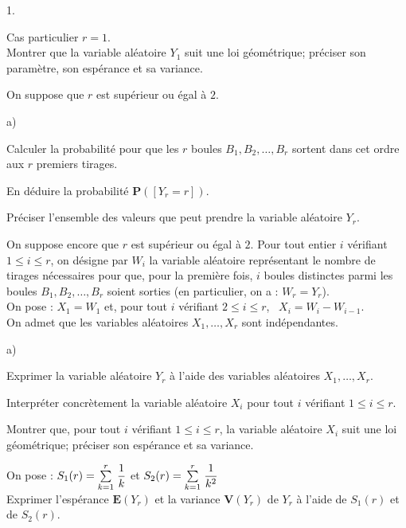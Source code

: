 \documentclass[11pt]{article}%
\begin{document}
\begin{noliste}{1.}
 \setlength{\itemsep}{4mm}
\item Cas particulier $r = 1$. \\
Montrer que la variable aléatoire $Y_{1}$ suit une loi géométrique;
préciser
son paramètre, son espérance et sa variance.

\item On suppose que $r$ est supérieur ou égal à $2$.

\begin{noliste}{a)}
 \setlength{\itemsep}{2mm}
\item Calculer la probabilité pour que les $r$ boules
$B_{1},B_{2},\ldots,B_{r}$ sortent dans cet ordre aux $r$ premiers
tirages.

\item En déduire la probabilité $\mathbf{P}([Y_{r} = r])$.

\item Préciser l'ensemble des valeurs que peut prendre la variable
aléatoire 
$Y_{r}$.
\end{noliste}

\item On suppose encore que $r$ est supérieur ou égal à $2$. Pour tout
entier $i$ vérifiant $1\leq i\leq r$, on désigne par $W_{i}$ la
variable aléatoire représentant le nombre de tirages nécessaires pour
que,
pour la première fois, $i$ boules distinctes parmi les boules
$B_{1},B_{2},\ldots,B_{r}$ soient sorties (en particulier, on a :
$W_{r} = Y_{r}$).\\
On pose : \quad $X_{1} = W_{1}$ \quad et, pour tout $i$ vérifiant
$2\leq
i\leq r$, \ $X_{i} = W_{i}-W_{i-1}$. \\
On admet que les variables aléatoires $X_{1},\ldots,X_{r}$ sont
indépendantes.

\begin{noliste}{a)}
 \setlength{\itemsep}{2mm}
\item Exprimer la variable aléatoire $Y_{r}$ à l'aide des variables
aléatoires $X_{1},\ldots,X_{r}$.

\item Interpréter concrètement la variable aléatoire $X_{i}$ pour tout
$i$ vérifiant $1\leq i\leq r$.

\item Montrer que, pour tout $i$ vérifiant $1\leq i\leq r$, la
variable aléatoire $X_{i}$ suit une loi géométrique; préciser son
espérance
et sa variance.

\item On pose : $S_{1}(r) = {\textstyle\sum\limits_{k = 1}^{r}}\hspace{.1cm}\dfrac{1}{k}$ \quad et \quad
$S_{2}(r) = {\textstyle\sum\limits_{k = 1}^{r}}\hspace{.1cm}\dfrac{1}{k^{2}}$\\
Exprimer l'espérance $\mathbf{E}(Y_{r})$ et la variance
$\mathbf{V}(Y_{r})$
de $Y_{r}$ à l'aide de $S_{1}(r)$ et de $S_{2}(r)$.
\end{noliste}


\end{noliste}
\end{document}
